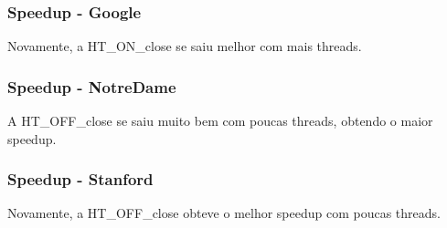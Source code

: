\documentclass{beamer}
\begin{document}
\begin{frame}
    \frametitle{Speedup - Google}

    \begin{figure}
        \centering
    \end{figure}
    \centering
    Novamente, a HT\_ON\_close se saiu melhor com mais threads.
\end{frame}

\begin{frame}
    \frametitle{Speedup - NotreDame}

    \begin{figure}
        \centering
    \end{figure}
    \centering
    A HT\_OFF\_close se saiu muito bem com poucas threads, obtendo o maior speedup.
\end{frame}

\begin{frame}
    \frametitle{Speedup - Stanford}

    \begin{figure}
        \centering
    \end{figure}
    \centering
    Novamente, a HT\_OFF\_close obteve o melhor speedup com poucas threads.
\end{frame}
\end{document}
